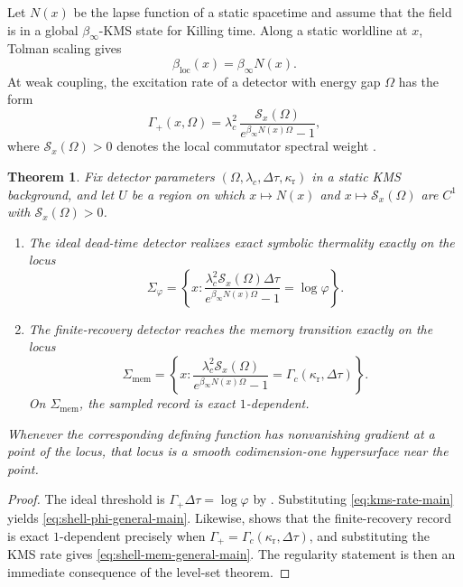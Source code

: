 \documentclass[11pt]{amsart}
\numberwithin{equation}{section}
\newtheorem{theorem}{Theorem}[section]
\theoremstyle{remark}
\begin{document}
Let $N(x)$ be the lapse function of a static spacetime and assume that the field is in a global $\beta_\infty$-KMS state for Killing time. Along a static worldline at $x$, Tolman scaling gives
\begin{equation}\label{eq:tolman-main}
\beta_{\mathrm{loc}}(x)=\beta_\infty N(x).
\end{equation}
At weak coupling, the excitation rate of a detector with energy gap $\Omega$ has the form
\begin{equation}\label{eq:kms-rate-main}
\Gamma_+(x,\Omega)=
\lambda_c^2\,
\frac{\mathcal S_x(\Omega)}{e^{\beta_\infty N(x)\Omega}-1},
\end{equation}
where $\mathcal S_x(\Omega)>0$ denotes the local commutator spectral weight \cite{KayWald1991,BuchholzSchlemmer2007,Solveen2012,GranseePinamontiVerch2017}.

\begin{theorem}\label{thm:shells-general-main}
Fix detector parameters $(\Omega,\lambda_c,\Delta\tau,\kappa_{\mathrm r})$ in a static KMS background, and let $U$ be a region on which $x\mapsto N(x)$ and $x\mapsto\mathcal S_x(\Omega)$ are $C^1$ with $\mathcal S_x(\Omega)>0$.
\begin{enumerate}[label=\textup{(\roman*)},leftmargin=2.2em,itemsep=0.25em]
\item The ideal dead-time detector realizes exact symbolic thermality exactly on the locus
\begin{equation}\label{eq:shell-phi-general-main}
\Sigma_{\varphi}=
\left\{x:
\frac{\lambda_c^2\mathcal S_x(\Omega)\Delta\tau}{e^{\beta_\infty N(x)\Omega}-1}=\log\varphi
\right\}.
\end{equation}
\item The finite-recovery detector reaches the memory transition exactly on the locus
\begin{equation}\label{eq:shell-mem-general-main}
\Sigma_{\mathrm{mem}}=
\left\{x:
\frac{\lambda_c^2\mathcal S_x(\Omega)}{e^{\beta_\infty N(x)\Omega}-1}
=\Gamma_c(\kappa_{\mathrm r},\Delta\tau)
\right\}.
\end{equation}
On $\Sigma_{\mathrm{mem}}$, the sampled record is exact $1$-dependent.
\end{enumerate}
Whenever the corresponding defining function has nonvanishing gradient at a point of the locus, that locus is a smooth codimension-one hypersurface near the point.
\end{theorem}

\begin{proof}
The ideal threshold is $\Gamma_+\Delta\tau=\log\varphi$ by . Substituting \eqref{eq:kms-rate-main} yields \eqref{eq:shell-phi-general-main}. Likewise,  shows that the finite-recovery record is exact $1$-dependent precisely when $\Gamma_+=\Gamma_c(\kappa_{\mathrm r},\Delta\tau)$, and substituting the KMS rate gives \eqref{eq:shell-mem-general-main}. The regularity statement is then an immediate consequence of the level-set theorem.
\end{proof}
\end{document}
